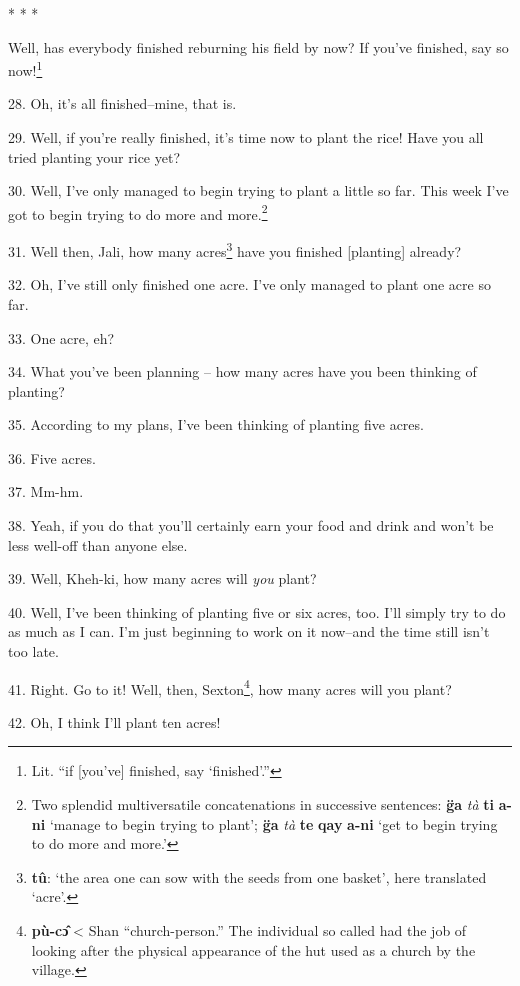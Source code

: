 \begin{center}
* * *
\end{center}

Well, has everybody finished reburning his field by now? If you've finished, say
so now!\footnote{Lit. ``if [you've] finished, say `finished'.''}

28. Oh, it's all finished--mine, that is.

29. Well, if you're really finished, it's time now to plant the rice! Have you
all tried planting your rice yet?

30. Well, I've only managed to begin trying to plant a little so far. This week
I've got to begin trying to do more and more.\footnote{Two splendid multiversatile concatenations in successive sentences: \textbf{g̈a} \textit{\emph{tà}} \textbf{ti} \textbf{a-ni} `manage to begin trying to plant'; \textbf{g̈a} \textit{\emph{tà}} \textbf{te} \textbf{qay} \textbf{a-ni} `get to begin trying to do more and more.'}

31. Well then, Jali, how many acres\footnote{\textbf{tû}: `the area one can sow with the seeds from one basket', here translated `acre'.} have you finished [planting] already?

32. Oh, I've still only finished one acre. I've only managed to plant one acre
so far.

33. One acre, eh?

34. What you've been planning -- how many acres have you been thinking of planting?

35. According to my plans, I've been thinking of planting five acres.

36. Five acres.

37. Mm-hm.

38. Yeah, if you do that you'll certainly earn your food and drink and won't be
less well-off than anyone else.

39. Well, Kheh-ki, how many acres will \emph{you} plant?

40. Well, I've been thinking of planting five or six acres, too. I'll simply try
to do as much as I can. I'm just beginning to work on it now--and the time still
isn't too late.

41. Right. Go to it! Well, then, Sexton\footnote{\textbf{pù-cɔ̂} < Shan ``church-person.'' The individual so called had the job of looking after the physical appearance of the hut used as a church by the village.}, how many acres will you plant?

42. Oh, I think I'll plant ten acres!

